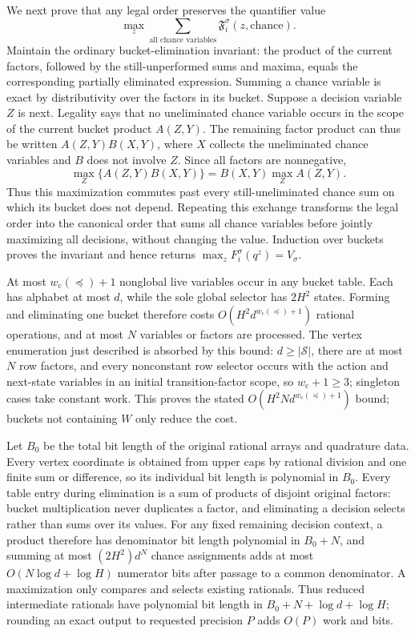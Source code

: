 We next prove that any legal order preserves the quantifier value
\[
 \max_z\sum_{\text{all chance variables}}\mathfrak F_i^\sigma(z,\text{chance}).
\]
Maintain the ordinary bucket-elimination invariant: the product of the current factors, followed by the still-unperformed sums and maxima, equals the corresponding partially eliminated expression.  Summing a chance variable is exact by distributivity over the factors in its bucket.  Suppose a decision variable \(Z\) is next.  Legality says that no uneliminated chance variable occurs in the scope of the current bucket product \(A(Z,Y)\).  The remaining factor product can thus be written \(A(Z,Y)B(X,Y)\), where \(X\) collects the uneliminated chance variables and \(B\) does not involve \(Z\).  Since all factors are nonnegative,
\[
 \max_Z\{A(Z,Y)B(X,Y)\}=B(X,Y)\max_ZA(Z,Y).
\]
Thus this maximization commutes past every still-uneliminated chance sum on which its bucket does not depend.  Repeating this exchange transforms the legal order into the canonical order that sums all chance variables before jointly maximizing all decisions, without changing the value.  Induction over buckets proves the invariant and hence returns \(\max_zF_i^\sigma(q^z)=V_\sigma\).

At most \(w_{\mathrm c}(\preceq)+1\) nonglobal live variables occur in any bucket table.  Each has alphabet at most \(d\), while the sole global selector has \(2H^2\) states.  Forming and eliminating one bucket therefore costs \(O(H^2d^{w_{\mathrm c}(\preceq)+1})\) rational operations, and at most \(N\) variables or factors are processed.  The vertex enumeration just described is absorbed by this bound: \(d\ge|\mathcal S|\), there are at most \(N\) row factors, and every nonconstant row selector occurs with the action and next-state variables in an initial transition-factor scope, so \(w_{\mathrm c}+1\ge3\); singleton cases take constant work.  This proves the stated \(O(H^2N d^{w_{\mathrm c}(\preceq)+1})\) bound; buckets not containing \(W\) only reduce the cost.

Let \(B_0\) be the total bit length of the original rational arrays and quadrature data.  Every vertex coordinate is obtained from upper caps by rational division and one finite sum or difference, so its individual bit length is polynomial in \(B_0\).  Every table entry during elimination is a sum of products of disjoint original factors: bucket multiplication never duplicates a factor, and eliminating a decision selects rather than sums over its values.  For any fixed remaining decision context, a product therefore has denominator bit length polynomial in \(B_0+N\), and summing at most \((2H^2)d^N\) chance assignments adds at most \(O(N\log d+\log H)\) numerator bits after passage to a common denominator.  A maximization only compares and selects existing rationals.  Thus reduced intermediate rationals have polynomial bit length in \(B_0+N+\log d+\log H\); rounding an exact output to requested precision \(P\) adds \(O(P)\) work and bits.

